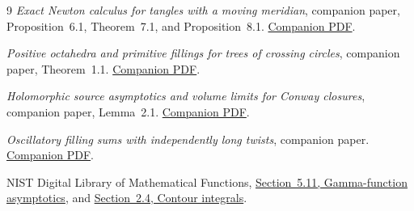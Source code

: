 \begin{thebibliography}{9}
\emph{Exact Newton calculus for tangles with a moving meridian},
companion paper, Proposition~6.1, Theorem~7.1,
and Proposition~8.1.
\href{https://sashakolpakov.github.io/murakamis_dream/papers/meridian-tangles.pdf}
{Companion PDF}.

\emph{Positive octahedra and primitive fillings for trees of crossing circles},
companion paper, Theorem~1.1.
\href{https://sashakolpakov.github.io/murakamis_dream/papers/circle-tree-geometry.pdf}
{Companion PDF}.

\emph{Holomorphic source asymptotics and volume limits for Conway closures},
companion paper, Lemma~2.1.
\href{https://sashakolpakov.github.io/murakamis_dream/papers/conway-asymptotics.pdf}
{Companion PDF}.

\emph{Oscillatory filling sums with independently long twists},
companion paper.
\href{https://sashakolpakov.github.io/murakamis_dream/papers/oscillatory-fillings.pdf}
{Companion PDF}.

NIST Digital Library of Mathematical Functions,
\href{https://dlmf.nist.gov/5.11}{Section~5.11, Gamma-function asymptotics},
and \href{https://dlmf.nist.gov/2.4}{Section~2.4, Contour integrals}.
\end{thebibliography}

